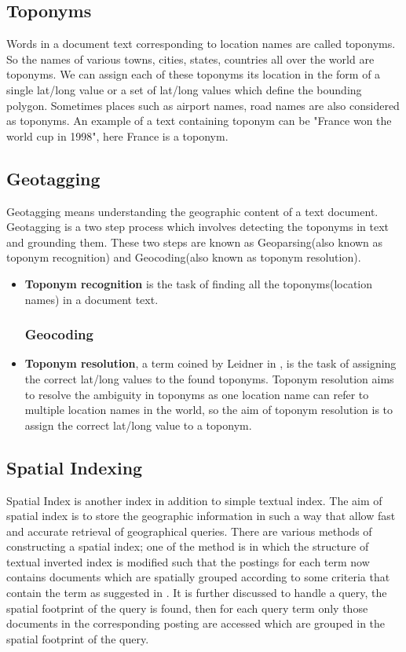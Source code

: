\documentclass[
     11pt,         %
     a4paper,      %
     oneside,
     ]{article}
\begin{document}
\subsection{Toponyms} Words in a document text corresponding to location names are called toponyms. So the names of various towns, cities, states, countries all over the world are toponyms. We can assign each of these toponyms its location in the form of a single lat/long value or a set of lat/long values which define the bounding polygon. Sometimes places such as airport names, road names are also considered as toponyms. An example of a text containing toponym can be "France won the world cup in 1998", here France is a toponym. 
\subsection{Geotagging} Geotagging means understanding the geographic content of a text document. Geotagging is a two step process which involves detecting the toponyms in text and grounding them. These two steps are known as Geoparsing(also known as toponym recognition) and Geocoding(also known as toponym resolution). 

\begin{itemize}
	\subsubsection{Geoparsing}
	\item[] \textbf{Toponym recognition} is the task of finding all the toponyms(location names) in a document text.
	\subsubsection{Geocoding}
	\item[] \textbf{Toponym resolution}, a term coined by Leidner in \cite{Leidner:2008:PhD}, is the task of assigning the correct lat/long values to the found toponyms. Toponym resolution aims to resolve the ambiguity in toponyms as one location name can refer to multiple location names in the world, so the aim of toponym resolution is to assign the correct lat/long value to a toponym.
\end{itemize}

\subsection{Spatial Indexing} Spatial Index is another index in addition to simple textual index. The aim of spatial index is to store the geographic information in such a way that allow fast and accurate retrieval of geographical queries. There are various methods of constructing a spatial index; one of the method is in which the structure of textual inverted index is modified such that the postings for each term now contains documents which are spatially grouped according to some criteria that contain the term as suggested in \cite{Vaid:2005:SIG:2156226.2156244}. It is further discussed to handle a query, the spatial footprint of the query is found, then for each query term only those documents in the corresponding posting are accessed which are grouped in the spatial footprint of the query. 
\end{document}
